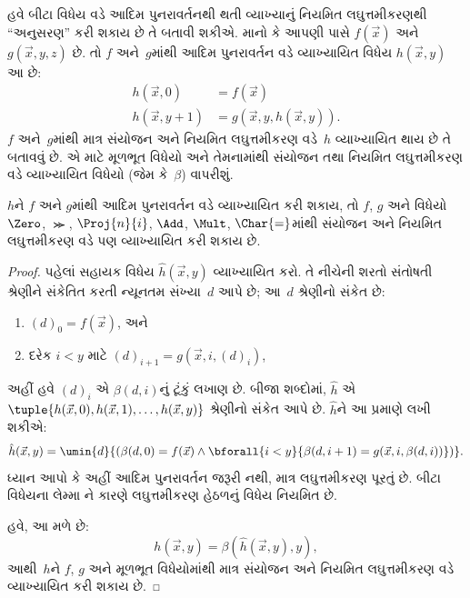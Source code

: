 \documentclass[../../../include/open-logic-section]{subfiles}
\begin{document}

હવે બીટા વિધેય વડે આદિમ
પુનરાવર્તનથી થતી વ્યાખ્યાનું
નિયમિત લઘુત્તમીકરણથી ``અનુસરણ''
કરી શકાય છે તે બતાવી શકીએ.
માનો કે આપણી પાસે $f(\vec x)$
અને $g(\vec x, y, z)$ છે.
તો $f$ અને~$g$માંથી આદિમ
પુનરાવર્તન વડે વ્યાખ્યાયિત વિધેય
$h(\vec x,y)$ આ છે:
\begin{align*}
h(\vec x, 0) & =  f(\vec x) \\
h(\vec x, y+1) & =  g(\vec x, y, h(\vec x, y)).
\end{align*}
$f$ અને~$g$માંથી માત્ર સંયોજન
અને નિયમિત લઘુત્તમીકરણ વડે~$h$
વ્યાખ્યાયિત થાય છે તે બતાવવું છે.
એ માટે મૂળભૂત વિધેયો અને
તેમનામાંથી સંયોજન તથા નિયમિત
લઘુત્તમીકરણ વડે વ્યાખ્યાયિત
વિધેયો (જેમ કે~$\beta$) વાપરીશું.

\begin{lem}
$h$ને $f$ અને $g$માંથી આદિમ
પુનરાવર્તન વડે વ્યાખ્યાયિત
કરી શકાય, તો $f$, $g$ અને
વિધેયો $\Zero$, $\Succ$,
$\Proj{n}{i}$, $\Add$, $\Mult$,
$\Char{=}$માંથી સંયોજન અને
નિયમિત લઘુત્તમીકરણ વડે પણ
વ્યાખ્યાયિત કરી શકાય છે.
\end{lem}

\begin{proof}
પહેલાં સહાયક વિધેય $\hat h(\vec x, y)$
વ્યાખ્યાયિત કરો. તે નીચેની
શરતો સંતોષતી શ્રેણીને સંકેતિત
કરતી ન્યૂનતમ સંખ્યા~$d$ આપે છે;
આ~$d$ શ્રેણીનો સંકેત છે:
\begin{enumerate}
\item $(d)_0 = f(\vec x)$, અને
\item દરેક $i < y$ માટે $(d)_{i+1} = g(\vec x, i, (d)_i)$,
\end{enumerate}
અહીં હવે $(d)_i$ એ $\beta(d,i)$નું
ટૂંકું લખાણ છે. બીજા શબ્દોમાં,
$\hat h$ એ
$\tuple{h(\vec x, 0), h(\vec x, 1),
\dots, h(\vec x, y)}$ શ્રેણીનો
સંકેત આપે છે.
$\hat h$ને આ પ્રમાણે લખી શકીએ:
\[
\hat h(\vec x, y) = \umin{d}{(\beta(d,0) = f(\vec x) \land \bforall{i <
  y}{\beta(d,i+1) = g(\vec x, i,\beta(d,i))})}.
\]
ધ્યાન આપો કે અહીં આદિમ
પુનરાવર્તન જરૂરી નથી, માત્ર
લઘુત્તમીકરણ પૂરતું છે. બીટા
વિધેયના લેમ્મા
ને કારણે
લઘુત્તમીકરણ હેઠળનું વિધેય
નિયમિત છે.

હવે, આ મળે છે:
\[
h(\vec x, y) = \beta(\hat h(\vec x, y), y),
\]
આથી~$h$ને $f$, $g$ અને મૂળભૂત વિધેયોમાંથી
માત્ર સંયોજન અને નિયમિત
લઘુત્તમીકરણ વડે વ્યાખ્યાયિત
કરી શકાય છે.
\end{proof}
\end{document}
